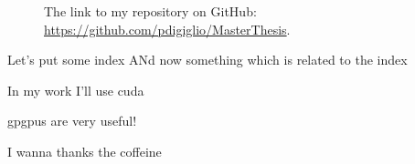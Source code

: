 \documentclass[
	10pt,
	twoside,
	openright,
]{scrbook}
\begin{document}
\begin{figure}
	\centering
\caption{The link to my repository on GitHub: \url{https://github.com/pdigiglio/MasterThesis}.}
\end{figure}


Let's put some index
ANd now something which is related to the index




In my work I'll use \gls{cuda}

\glspl{gpgpu} are very useful!

I wanna thanks the coffeine
%

%
\backmatter
	\printnoidxglossaries

	\cleardoublepage
	\printindex

	\cleardoublepage
	\nocite{*}
	\printbibliography
\end{document}

